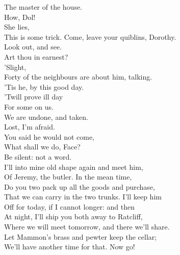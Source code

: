 \documentclass[a4paper,oneside,12pt]{memoir}
\begin{document}
\begin{drama*}
The master of the house.\\
\subtlespeaks {} How, Dol!\\
\facespeaks {} She lies,\\
This is some trick. Come, leave your quiblins, Dorothy.\\
\dolspeaks Look out, and see.\\
\subtlespeaks {} Art thou in earnest?\\
\dolspeaks {} 'Slight,\\
Forty of the neighbours are about him, talking.\\
\facespeaks 'Tis he, by this good day.\\
\dolspeaks {} 'Twill prove ill day\\
For some on us.\\
\facespeaks {} We are undone, and taken.\\
\dolspeaks Lost, I'm afraid.\\
\subtlespeaks {} You said he would not come,\\
What shall we do, Face?\\
\facespeaks {} Be silent: not a word.\\
I'll into mine old shape again and meet him,\\
Of Jeremy, the butler. In the mean time,\\
Do you two pack up all the goods and purchase,\\
That we can carry in the two trunks. I'll keep him\\
Off for today, if I cannot longer: and then\\
At night, I'll ship you both away to Ratcliff,\\
Where we will meet tomorrow, and there we'll share.\\
Let Mammon's brass and pewter keep the cellar;\\
We'll have another time for that. Now go!\\

\scene


\end{drama*}
\end{document}
